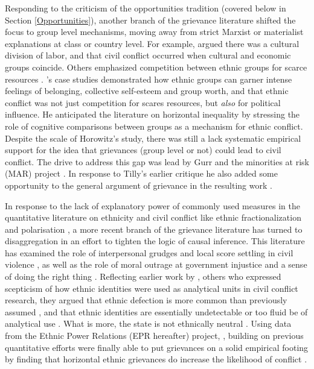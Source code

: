 Responding to the criticism of the opportunities tradition (covered below in Section
\ref{Opportunities}), another branch of the grievance literature shifted the
focus to group level mechanisms, moving away from strict Marxist or materialist
explanations at class or country level. For example, \citet{Hechter_1978} argued
there was a cultural division of labor, and that civil conflict occurred when
cultural and economic groups coincide. Others emphasized competition between
ethnic groups for scarce resources \citep{barth1969}. \citet{Horowitz1985}'s
case studies demonstrated how ethnic groups can garner intense feelings of
belonging, collective self-esteem and group worth, and that ethnic conflict was
not just competition for scares resources, but \textit{also} for political
influence. He anticipated the literature on horizontal inequality by stressing
the role of cognitive comparisons between groups as a mechanism for ethnic
conflict. Despite the scale of Horowitz's study, there was still a lack
systematic empirical support for the idea that grievances (group level or not)
could lead to civil conflict. The drive to address this gap was lead by Gurr and
the minorities at risk (MAR) project \citet{GurrTedRobert1993Mar:}. In response
to Tilly's earlier critique he also added some opportunity to the general
argument of grievance in the resulting work \citep{Gurr_1993}. 

In response to the lack of explanatory power of commonly used measures in the
quantitative literature on ethnicity and civil conflict like ethnic
fractionalization \citep{Alesina2003, Posner2004} and polarisation
\citep{Montalvo2005}, a more recent branch of the grievance literature has
turned to disaggregation in an effort to tighten the logic of causal inference.
This literature has examined  the role of interpersonal grudges and local score
settling in civil violence \citep{Kalyvas2006, Kalyvas_2008}, as well as the
role of moral outrage at government injustice and a sense of doing the right
thing \citep{Wood2003}. Reflecting earlier work by \citet{barth1969}, others who
expressed scepticism of how ethnic identities were used as analytical units in
civil conflict research, they argued that ethnic defection is more common than
previously assumed \citep{Kalyvas_2008, Staniland_2012}, and that ethnic
identities are essentially undetectable or too fluid be of analytical use
\citep{Gilley_2004, Chandra2006}. What is more, the state is not ethnically
neutral \citep{CedermanLars-Erik2013Igac}. Using data from the Ethnic Power
Relations (EPR hereafter) project, \citet{CedermanLars-Erik2013Igac}, building
on previous quantitative efforts \citep{Gurr_1993, Goldstone_2010} were finally
able to put grievances on a solid empirical footing by finding that horizontal
ethnic grievances do increase the likelihood of conflict
\citep{CedermanLars-Erik2013Igac}. 

